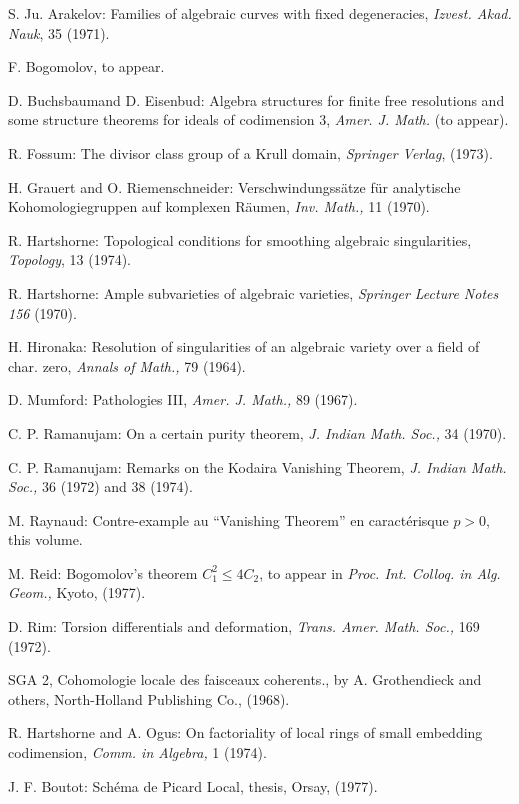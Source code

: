 \begin{thebibliography}{}
 S. Ju. Arakelov: Families of algebraic curves
with fixed degeneracies, {\em Izvest. Akad. Nauk}, 35 (1971).

 F. Bogomolov, to appear.

 D. Buchsbaum\pageoriginale and D. Eisenbud:
Algebra structures for finite free resolutions and some structure
theorems for ideals of codimension 3, {\em Amer. J. Math.} (to appear).

 R. Fossum: The divisor class group of a Krull
domain, {\em Springer Verlag}, (1973).

 H. Grauert and O. Riemenschneider:
Verschwindungss\"atze f\"ur analytische Kohomologiegruppen auf
komplexen R\"aumen, {\em Inv. Math.,} 11 (1970).

 R. Hartshorne: Topological conditions for
smoothing algebraic singularities, {\em Topology}, 13 (1974).

 R. Hartshorne: Ample subvarieties of algebraic
varieties, {\em Springer Lecture Notes 156} (1970). 

 H. Hironaka: Resolution of singularities of an
algebraic variety over a field of char. zero, {\em Annals of Math.,}
79 (1964).

 D. Mumford: Pathologies III, {\em
Amer. J. Math.,} 89 (1967). 

 C. P. Ramanujam: On a certain purity theorem,
{\em J. Indian Math. Soc.,} 34 (1970).

 C. P. Ramanujam: Remarks on the Kodaira
Vanishing Theorem, {\em J. Indian Math. Soc.,} 36 (1972) and 38 (1974).

 M. Raynaud: Contre-example au ``Vanishing
Theorem'' en caract\'erisque $p>0$, this volume.

 M. Reid: Bogomolov's theorem $C^{2}_{1}\leq
4C_{2}$, to appear in {\em Proc. Int. Colloq. in Alg. Geom.,} Kyoto, (1977).

 D. Rim: Torsion differentials and deformation,
{\em Trans. Amer. Math. Soc.,} 169 (1972).

 SGA 2, Cohomologie locale des faisceaux
coherents., by A. Grothendieck and others, North-Holland Publishing
Co., (1968). 

 R. Hartshorne and A. Ogus: On factoriality of
local rings of small embedding codimension, {\em Comm. in Algebra,} 1
(1974).

 J. F. Boutot: Sch\'ema de Picard Local, thesis,
Orsay, (1977).
\end{thebibliography}


